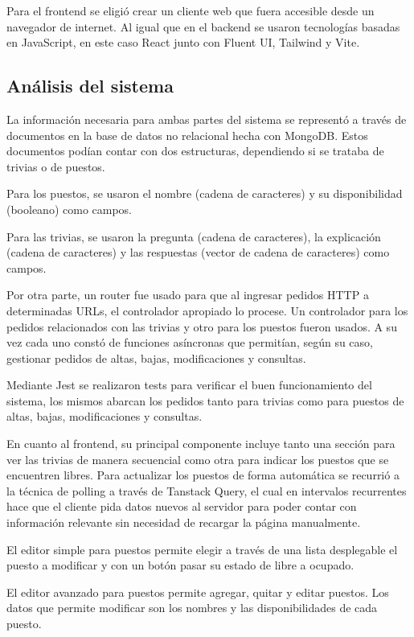 \documentclass{article}
\begin{document}
Para el frontend se eligió crear un cliente web que fuera accesible desde un navegador de internet. Al igual que en el backend se usaron tecnologías basadas en JavaScript, en este caso React junto con Fluent UI, Tailwind y Vite.
\subsection{Análisis del sistema}
La información necesaria para ambas partes del sistema se representó a través de documentos en la base de datos no relacional hecha con MongoDB. Estos documentos podían contar con dos estructuras, dependiendo si se trataba de trivias o de puestos.

Para los puestos, se usaron el nombre (cadena de caracteres) y su disponibilidad (booleano) como campos.

Para las trivias, se usaron la pregunta (cadena de caracteres), la explicación (cadena de caracteres) y las respuestas (vector de cadena de caracteres) como campos.

Por otra parte, un router fue usado para que al ingresar pedidos HTTP a determinadas URLs, el controlador apropiado lo procese. Un controlador para los pedidos relacionados con las trivias y otro para los puestos fueron usados. A su vez cada uno constó de funciones asíncronas que permitían, según su caso, gestionar pedidos de altas, bajas, modificaciones y consultas.

Mediante Jest se realizaron tests para verificar el buen funcionamiento del sistema, los mismos abarcan los pedidos tanto para trivias como para puestos de altas, bajas, modificaciones y consultas.

En cuanto al frontend, su principal componente incluye tanto una sección para ver las trivias de manera secuencial como otra para indicar los puestos que se encuentren libres. Para actualizar los puestos de forma automática se recurrió a la técnica de polling a través de Tanstack Query, el cual en intervalos recurrentes hace que el cliente pida datos nuevos al servidor para poder contar con información relevante sin necesidad de recargar la página manualmente.

El editor simple para puestos permite elegir a través de una lista desplegable el puesto a modificar y con un botón pasar su estado de libre a ocupado.

El editor avanzado para puestos permite agregar, quitar y editar puestos. Los datos que permite modificar son los nombres y las disponibilidades de cada puesto.
\end{document}

